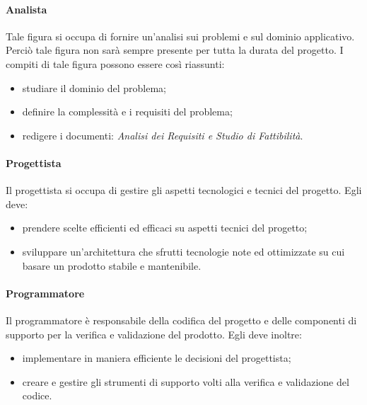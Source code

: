 			\paragraph{Analista}
			Tale figura si occupa di fornire un'analisi sui problemi e sul dominio applicativo. Perciò tale figura non sarà sempre presente per tutta la durata del progetto.
			I compiti di tale figura possono essere così riassunti:
			\begin{itemize}
				\item studiare il dominio del problema;
				\item definire la complessità e i requisiti del problema;
				\item redigere i documenti: \textit{Analisi dei Requisiti e Studio di Fattibilità}.
			\end{itemize}
		
			\paragraph{Progettista}
			Il progettista si occupa di gestire gli aspetti tecnologici e tecnici del progetto.
			Egli deve:
			\begin{itemize}
				\item prendere scelte efficienti ed efficaci su aspetti tecnici del progetto;
				\item sviluppare un'architettura che sfrutti tecnologie note ed ottimizzate su cui basare un prodotto stabile e mantenibile.
			\end{itemize}
		
			\paragraph{Programmatore}
			Il programmatore è responsabile della codifica del progetto e delle componenti di supporto per la verifica e validazione del prodotto. Egli deve inoltre: 
			\begin{itemize}
				\item implementare in maniera efficiente le decisioni del progettista;
				\item creare e gestire gli strumenti di supporto volti alla verifica e validazione del codice.
			\end{itemize}
		
